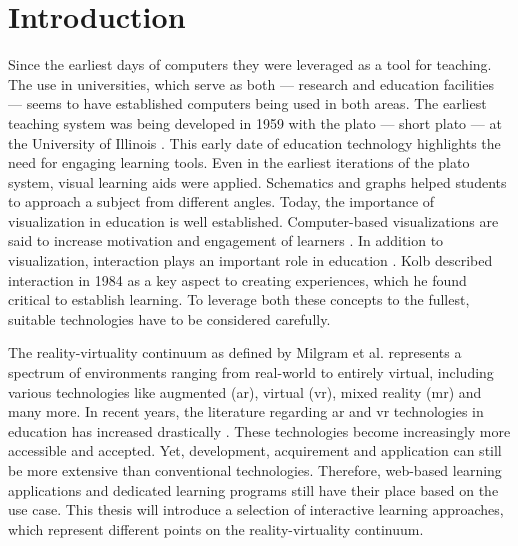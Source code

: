 %





\chapter{Introduction}
\label{sec:intro}


Since the earliest days of computers they were leveraged as a tool for teaching. The use in universities, which serve as both --- research and education facilities --- seems to have established computers being used in both areas. The earliest teaching system was being developed in 1959 with the \acrlong{plato} --- short \acrshort{plato} --- at the University of Illinois \cite{cope2023history}. This early date of education technology highlights the need for engaging learning tools. Even in the earliest iterations of the \acrshort{plato} system, visual learning aids were applied. Schematics and graphs helped students to approach a subject from different angles. Today, the importance of visualization in education is well established. Computer-based visualizations are said to increase motivation and engagement of learners \cite{vavra2011visualization}. In addition to visualization, interaction plays an important role in education \cite{firat2018towards}. Kolb described interaction in 1984 \cite{kolb:1984:experiential} as a key aspect to creating experiences, which he found critical to establish learning. To leverage both these concepts to the fullest, suitable technologies have to be considered carefully.

The reality-virtuality continuum as defined by Milgram et al. \cite{milgram1994arc} represents a spectrum of environments ranging from real-world to entirely virtual, including various technologies like augmented (\acrshort{ar}), virtual (\acrshort{vr}), mixed reality (\acrshort{mr}) and many more. In recent years, the literature regarding \acrshort{ar} and \acrshort{vr} technologies in education has increased drastically \cite{alansi2023analyzing}. These technologies become increasingly more accessible and accepted. Yet, development, acquirement and application can still be more extensive than conventional technologies. Therefore, web-based learning applications and dedicated learning programs still have their place based on the use case. This thesis will introduce a selection of interactive learning approaches, which represent different points on the reality-virtuality continuum. 

